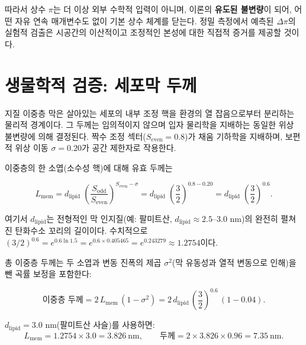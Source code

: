 \documentclass[12pt,a4paper]{article}
\theoremstyle{remark}
\begin{document}
	따라서 상수 \(\pi\)는 더 이상 외부 수학적 입력이 아니며, 이론의 \textbf{유도된 불변량}이 되어, 어떤 자유 연속 매개변수도 없이 기본 상수 체계를 닫는다. 정밀 측정에서 예측된 \(\Delta\pi\)의 실험적 검출은 시공간의 이산적이고 조정적인 본성에 대한 직접적 증거를 제공할 것이다.
	
	\section{생물학적 검증: 세포막 두께}
	\label{sec:bio-membrane}
	
	지질 이중층 막은 살아있는 세포의 내부 조정 핵을 환경의 열 잡음으로부터 분리하는 물리적 경계이다. 그 두께는 임의적이지 않으며 입자 물리학을 지배하는 동일한 위상 불변량에 의해 결정된다. 짝수 조정 섹터(\(S_{\mathrm{even}} = 0.8\))가 채움 기하학을 지배하며, 보편적 위상 이동 \(\sigma = 0.20\)가 공간 제한자로 작용한다.
	
	이중층의 한 소엽(소수성 핵)에 대해 유효 두께는
	
	\begin{equation}
		L_{\mathrm{mem}} = d_{\mathrm{lipid}} \;
		\left( \frac{S_{\mathrm{odd}}}{S_{\mathrm{even}}} \right)^{S_{\mathrm{even}} - \sigma}
		= d_{\mathrm{lipid}} \;
		\left( \frac{3}{2} \right)^{0.8 - 0.20}
		= d_{\mathrm{lipid}} \;
		\left( \frac{3}{2} \right)^{0.6}.
	\end{equation}
	
	여기서 \(d_{\mathrm{lipid}}\)는 전형적인 막 인지질(예: 팔미트산, \(d_{\mathrm{lipid}} \approx 2.5\)--\(3.0\) nm)의 완전히 펼쳐진 탄화수소 꼬리의 길이이다. 수치적으로 \((3/2)^{0.6} = e^{0.6\ln 1.5} = e^{0.6 \times 0.405465} = e^{0.243279} \approx 1.2754\)이다.
	
	총 이중층 두께는 두 소엽과 변동 진폭의 제곱 \(\sigma^2\)(막 유동성과 열적 변동으로 인해)을 뺀 곡률 보정을 포함한다:
	
	\begin{equation}
		\boxed{\text{이중층 두께} = 2 \, L_{\mathrm{mem}} \,
			(1 - \sigma^2) = 2 \, d_{\mathrm{lipid}} \,
			\left( \frac{3}{2} \right)^{0.6} \, (1 - 0.04)}.
	\end{equation}
	
	\(d_{\mathrm{lipid}} = 3.0\) nm(팔미트산 사슬)를 사용하면:
	\[
	L_{\mathrm{mem}} = 1.2754 \times 3.0 = 3.826\ \text{nm},
	\qquad
	\text{두께} = 2 \times 3.826 \times 0.96 = 7.35\ \text{nm}.
	\]
	
\end{document}
